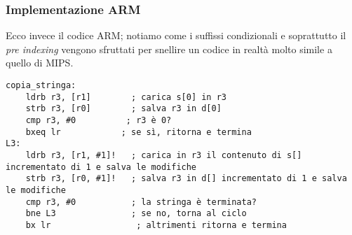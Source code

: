 \documentclass[class=book, crop=false, oneside]{standalone}
\begin{document}
\subsubsection{Implementazione ARM}
Ecco invece il codice ARM; notiamo come i suffissi condizionali  e soprattutto il \emph{pre indexing} vengono sfruttati per snellire un codice in realtà molto simile a quello di MIPS.
\begin{verbatim}
copia_stringa:
	ldrb r3, [r1]	     ; carica s[0] in r3
	strb r3, [r0]	     ; salva r3 in d[0]
	cmp r3, #0	        ; r3 è 0?
	bxeq lr	           ; se sì, ritorna e termina
L3:
	ldrb r3, [r1, #1]!	 ; carica in r3 il contenuto di s[] incrementato di 1 e salva le modifiche
	strb r3, [r0, #1]!	 ; salva r3 in d[] incrementato di 1 e salva le modifiche
	cmp r3, #0	         ; la stringa è terminata?
	bne L3	             ; se no, torna al ciclo
	bx lr	              ; altrimenti ritorna e termina
\end{verbatim}
\end{document}
